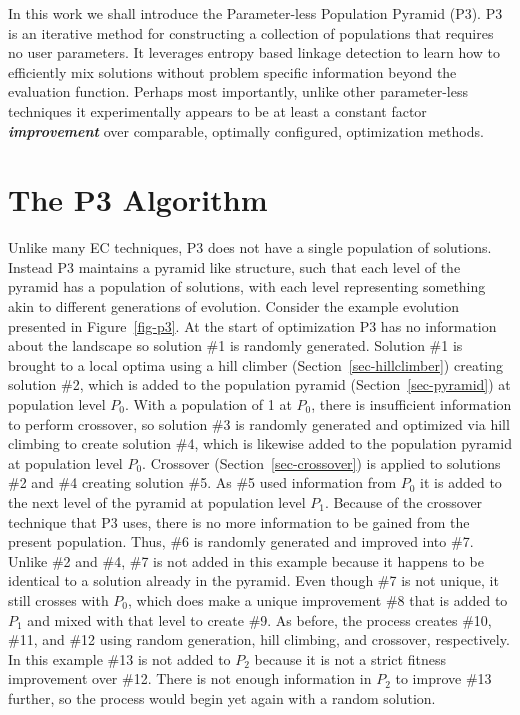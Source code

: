 \documentclass{sig-alternate}
\begin{document}
In this work we shall introduce the Parameter-less Population Pyramid
(P3).  P3 is an iterative method for constructing a collection of
populations that requires no user parameters.  It leverages entropy based
linkage detection to learn how to efficiently mix solutions without
problem specific information beyond the evaluation function.  Perhaps
most importantly, unlike other parameter-less techniques it
experimentally appears to be at least a constant factor
\emph{\textbf{improvement}} over comparable, optimally configured,
optimization methods.

\section{The P3 Algorithm}
\label{sec-p3}
Unlike many EC techniques, P3
does not have a single population of solutions.  Instead P3 maintains
a pyramid like structure, such that each level of the pyramid has a
population of solutions, with each level representing something akin
to different generations of evolution. Consider the example evolution
presented in Figure~\ref{fig-p3}.  At the start of optimization P3
has no information about the landscape so solution \#1 is randomly generated.  Solution \#1
is brought to a local optima using a hill climber
(Section~\ref{sec-hillclimber}) creating solution \#2, which is added
to the population pyramid (Section~\ref{sec-pyramid}) at population
level $P_0$.  With a population of 1 at $P_0$, there is insufficient information to perform crossover,
so solution \#3 is randomly generated and optimized via hill climbing
to create solution \#4, which is likewise added to the population
pyramid at population level $P_0$.
Crossover (Section~\ref{sec-crossover}) is applied to solutions \#2
and \#4 creating solution \#5. As \#5 used
information from $P_0$ it is added to the next level of the pyramid at
population level $P_1$.  Because of the crossover technique that P3
uses, there is no more information to be gained from the present
population. Thus, \#6 is randomly
generated and improved into \#7.  Unlike \#2 and \#4, \#7 is not added
in this example because it happens to be identical to a solution
already in the pyramid.  Even though \#7 is not unique, it still
crosses with $P_0$, which does make a unique improvement \#8 that is
added to $P_1$ and mixed with that level to create \#9.  As before,
the process creates \#10, \#11, and \#12 using random generation, hill
climbing, and crossover, respectively.  In this example \#13 is not
added to $P_2$ because it is not a strict fitness improvement over
\#12.  There is not enough information in $P_2$ to improve \#13
further, so the process would begin yet again with a random solution.
\end{document}
